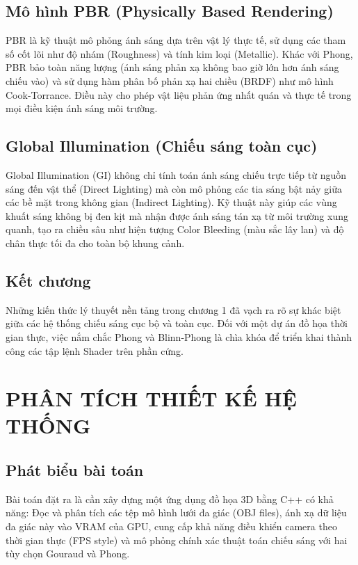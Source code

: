 \documentclass[13pt, a4paper]{extarticle}
\begin{document}
\subsection{Mô hình PBR (Physically Based Rendering)}
PBR là kỹ thuật mô phỏng ánh sáng dựa trên vật lý thực tế, sử dụng các tham số cốt lõi như độ nhám (Roughness) và tính kim loại (Metallic). Khác với Phong, PBR bảo toàn năng lượng (ánh sáng phản xạ không bao giờ lớn hơn ánh sáng chiếu vào) và sử dụng hàm phân bố phản xạ hai chiều (BRDF) như mô hình Cook-Torrance. Điều này cho phép vật liệu phản ứng nhất quán và thực tế trong mọi điều kiện ánh sáng môi trường.

\subsection{Global Illumination (Chiếu sáng toàn cục)}
Global Illumination (GI) không chỉ tính toán ánh sáng chiếu trực tiếp từ nguồn sáng đến vật thể (Direct Lighting) mà còn mô phỏng các tia sáng bật nảy giữa các bề mặt trong không gian (Indirect Lighting). Kỹ thuật này giúp các vùng khuất sáng không bị đen kịt mà nhận được ánh sáng tán xạ từ môi trường xung quanh, tạo ra chiều sâu như hiện tượng Color Bleeding (màu sắc lây lan) và độ chân thực tối đa cho toàn bộ khung cảnh.

\subsection{Kết chương}
Những kiến thức lý thuyết nền tảng trong chương 1 đã vạch ra rõ sự khác biệt giữa các hệ thống chiếu sáng cục bộ và toàn cục. Đối với một dự án đồ họa thời gian thực, việc nắm chắc Phong và Blinn-Phong là chìa khóa để triển khai thành công các tập lệnh Shader trên phần cứng.

\newpage
\section{PHÂN TÍCH THIẾT KẾ HỆ THỐNG}

\subsection{Phát biểu bài toán}
Bài toán đặt ra là cần xây dựng một ứng dụng đồ họa 3D bằng C++ có khả năng: Đọc và phân tích các tệp mô hình lưới đa giác (OBJ files), ánh xạ dữ liệu đa giác này vào VRAM của GPU, cung cấp khả năng điều khiển camera theo thời gian thực (FPS style) và mô phỏng chính xác thuật toán chiếu sáng với hai tùy chọn Gouraud và Phong.
\end{document}
